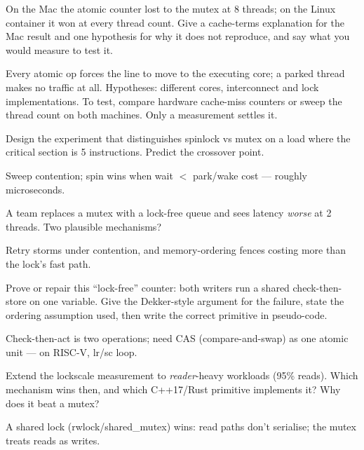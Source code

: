 \begin{exercise}[medium]
On the Mac the atomic counter lost to the mutex at 8 threads; on
the Linux container it won at every thread count. Give a cache-terms
explanation for the Mac result and one hypothesis for why it does not
reproduce, and say what you would measure to test it.
\end{exercise}
\begin{solution}[hint]
Every atomic op forces the line to move to the executing core; a
parked thread makes no traffic at all. Hypotheses: different cores,
interconnect and lock implementations. To test, compare hardware
cache-miss counters or sweep the thread count on both machines.
Only a measurement settles it.
\end{solution}

\begin{exercise}[medium]
Design the experiment that distinguishes spinlock vs mutex on a
load where the critical section is 5 instructions. Predict the
crossover point.
\end{exercise}
\begin{solution}[hint]
Sweep contention; spin wins when wait $<$ park/wake cost ---
roughly microseconds.
\end{solution}

\begin{exercise}[medium]
A team replaces a mutex with a lock-free queue and sees latency
\emph{worse} at 2 threads. Two plausible mechanisms?
\end{exercise}
\begin{solution}[hint]
Retry storms under contention, and memory-ordering fences costing
more than the lock's fast path.
\end{solution}

\begin{exercise}[hard]
Prove or repair this ``lock-free'' counter: both writers run a
shared check-then-store on one variable. Give the Dekker-style
argument for the failure, state the ordering assumption used, then
write the correct primitive in pseudo-code.
\end{exercise}
\begin{solution}[hint]
Check-then-act is two operations; need CAS (compare-and-swap) as
one atomic unit --- on RISC-V, lr/sc loop.
\end{solution}

\begin{exercise}[hard]
Extend the lockscale measurement to \emph{reader}-heavy workloads
(95\% reads). Which mechanism wins then, and which C++17/Rust
primitive implements it? Why does it beat a mutex?
\end{exercise}
\begin{solution}[hint]
A shared lock (rwlock/shared\_mutex) wins: read paths don't
serialise; the mutex treats reads as writes.
\end{solution}

